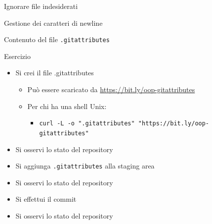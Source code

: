 \documentclass[xcolor=dvipsnames,presentation]{beamer}
\begin{document}
\begin{frame}{Ignorare file indesiderati}
\begin{block}{Gestione dei caratteri di newline}
\begin{itemize}
\begin{itemize}
            \end{itemize}
        \end{itemize}
    \end{block}
    \begin{block}{Contenuto del file \texttt{.gitattributes}}
    \end{block}
    \begin{block}{Esercizio}
        \begin{itemize}
            \item Si crei il file .gitattributes
            \begin{itemize}
                \item Può essere scaricato da \url{https://bit.ly/oop-gitattributes}
                \item Per chi ha una shell Unix:
                \begin{itemize}
                    \item {\scriptsize \texttt{curl -L -o ".gitattributes" "https://bit.ly/oop-gitattributes"}}
                \end{itemize}
            \end{itemize}
            \item Si osservi lo stato del repository
            \item Si aggiunga \texttt{.gitattributes} alla staging area
            \item Si osservi lo stato del repository
            \item Si effettui il commit
            \item Si osservi lo stato del repository
        \end{itemize}
    \end{block}
\end{frame}
\end{document}
